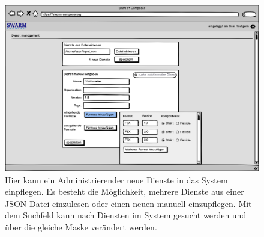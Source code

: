 \begin{figure}[h]
	\centering
	\includegraphics[width=\textwidth]{img/admin}
	\caption{
            Hier kann ein Administrierender neue Dienste in das System einpflegen.
            Es besteht die Möglichkeit, mehrere Dienste aus einer JSON Datei einzulesen
            oder einen neuen manuell einzupflegen. Mit dem Suchfeld kann nach Diensten
            im System gesucht werden und über die gleiche Maske verändert werden.
        }
	\label{fig:admin}
\end{figure}
